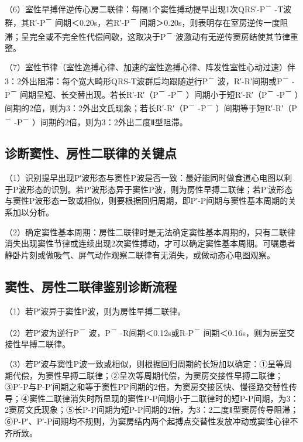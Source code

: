 （6）室性早搏伴逆传心房二联律：每隔1个窦性搏动提早出现1次QRS′-P\textsuperscript{－}
-T波群，其R′-P\textsuperscript{－}
间期＜0.20s，若R′-P\textsuperscript{－}
间期＞0.20s，则表明存在室房逆传一度阻滞；呈完全或不完全性代偿间歇，这取决于P\textsuperscript{－}
波激动有无逆传窦房结使其节律重整。

（7）室性节律（室性逸搏心律、加速的室性逸搏心律、阵发性室性心动过速）伴3：2外出阻滞：每个宽大畸形QRS-T波群后均跟随逆行P\textsuperscript{－}
波，R′-R′间期或P\textsuperscript{－} -P\textsuperscript{－}
间期呈短、长交替出现。若长R′-R′（P\textsuperscript{－}
-P\textsuperscript{－} ）间期小于短R′-R′（P\textsuperscript{－}
-P\textsuperscript{－}
）间期的2倍，则为3：2外出文氏现象；若长R′-R′（P\textsuperscript{－}
-P\textsuperscript{－} ）间期等于短R′-R′（P\textsuperscript{－}
-P\textsuperscript{－} ）间期的2倍，则为3：2外出二度Ⅱ型阻滞。

\protect\hypertarget{text00044.htmlux5cux23subid484}{}{}

\subsection{诊断窦性、房性二联律的关键点}

（1）识别提早出现P′波形态与窦性P波是否一致：最好能同时做食道心电图以利于P波形态的识别。若P′波形态异于窦性P波，则为房性早搏二联律；若P′波形态与窦性P波形态一致或相似，则要根据回归周期，即P′-P间期与窦性基本周期的关系加以分析。

（2）确定窦性基本周期：房性二联律时是无法确定窦性基本周期的，只有二联律消失出现窦性节律或连续出现2次窦性搏动，才可以确定窦性基本周期。可嘱患者静卧片刻或做吸气、屏气动作观察二联律有无消失，或做动态心电图观察。

\protect\hypertarget{text00044.htmlux5cux23subid485}{}{}

\subsection{窦性、房性二联律鉴别诊断流程}

（1）若P′波异于窦性P波，则为房性早搏二联律。

（2）若P′波为逆行P\textsuperscript{－} 波，P\textsuperscript{－}
-R间期＜0.12s或R-P\textsuperscript{－}
间期＜0.16s，则为房室交接性早搏二联律。

（3）若P′波与窦性P波一致或相似，则根据回归周期的长短加以确定：①呈等周期代偿，为窦性早搏二联律；②呈次等周期代偿，为窦房交接性早搏二联律；③P′-P与P-P′间期之和等于窦性PP间期的2倍，为窦房交接区快、慢径路交替性传导；④窦性二联律消失时所显现的窦性P-P间期小于二联律时的短P-P间期，为3：2窦房文氏现象；⑤长P-P间期为短P-P间期的2倍，为3：2二度Ⅱ型窦房传导阻滞；⑥P-P′、P′-P间期均不规则，为窦房结内两个起搏点交替性发放冲动或窦性心律不齐所致。

